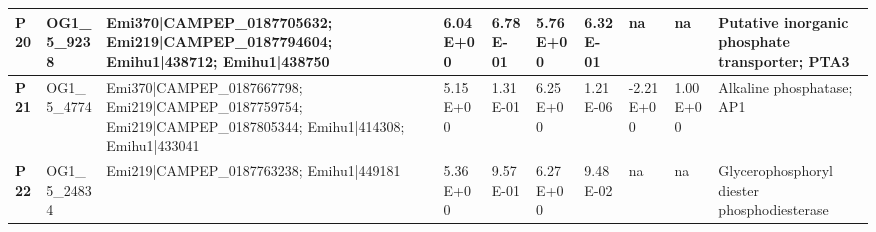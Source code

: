 \begin{landscape}
\begin{center}
\begin{footnotesize}
\begin{longtable}{|p{0.5cm}|p{1.5cm}|p{4cm}|l|l|l|l|l|l|l|}
\textbf{P20} & OG1\_5\_9238  & Emi370|CAMPEP\_0187705632; Emi219|CAMPEP\_0187794604; Emihu1|438712; Emihu1|438750                                                                                                                                                                                                                                                                                                                                                                                                                                                                                                                                                       & 6.04E+00  & 6.78E-01 & 5.76E+00  & 6.32E-01 & na        & na       & Putative inorganic phosphate transporter; PTA3                               \\ \hline
\textbf{P21} & OG1\_5\_4774  & Emi370|CAMPEP\_0187667798; Emi219|CAMPEP\_0187759754; Emi219|CAMPEP\_0187805344; Emihu1|414308; Emihu1|433041                                                                                                                                                                                                                                                                                                                                                                                                                                                                                                                            & 5.15E+00  & 1.31E-01 & 6.25E+00  & 1.21E-06 & -2.21E+00 & 1.00E+00 & Alkaline phosphatase; AP1                                                    \\ \hline
\textbf{P22} & OG1\_5\_24834 & Emi219|CAMPEP\_0187763238; Emihu1|449181                                                                                                                                                                                                                                                                                                                                                                                                                                                                                                                                                                                                 & 5.36E+00  & 9.57E-01 & 6.27E+00  & 9.48E-02 & na        & na       & Glycerophosphoryl diester phosphodiesterase                                  \\ \hline

\end{longtable}
\end{footnotesize}
\end{center}
\end{landscape}
